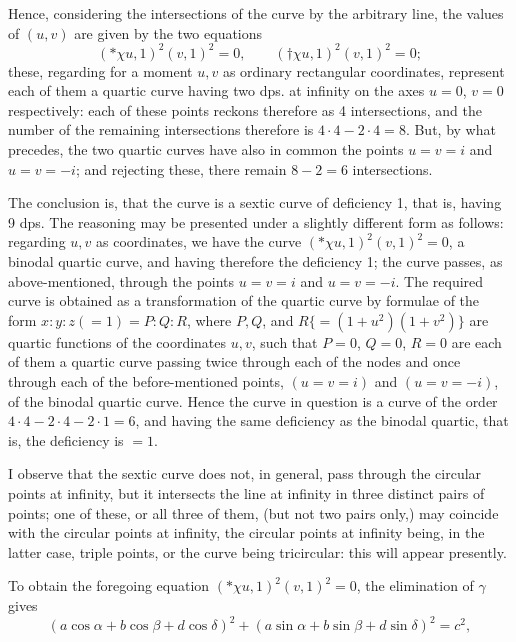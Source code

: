 \documentclass[11pt,a4paper]{article}
\begin{document}
Hence, considering the intersections of the curve by the arbitrary line, the values
of $(u,v)$ are given by the two equations
\[
({*}\chi u,1)^2(v,1)^2=0,\qquad
({\dagger}\chi u,1)^2(v,1)^2=0;
\]
these, regarding for a moment $u,v$ as ordinary rectangular coordinates, represent
each of them a quartic curve having two dps. at infinity on the axes $u=0$, $v=0$
respectively: each of these points reckons therefore as 4 intersections, and the
number of the remaining intersections therefore is $4\cdot4-2\cdot4=8$. But, by what
precedes, the two quartic curves have also in common the points $u=v=i$ and
$u=v=-i$; and rejecting these, there remain $8-2=6$ intersections.

The conclusion is, that the curve is a sextic curve of deficiency 1, that is, having
9 dps. The reasoning may be presented under a slightly different form as follows:
regarding $u,v$ as coordinates, we have the curve $({*}\chi u,1)^2(v,1)^2=0$, a
binodal quartic curve, and having therefore the deficiency 1; the curve passes, as
above-mentioned, through the points $u=v=i$ and $u=v=-i$. The required curve is
obtained as a transformation of the quartic curve by formulae of the form
$x:y:z(=1)=P:Q:R$, where $P,Q$, and $R\{=(1+u^2)(1+v^2)\}$ are quartic functions
of the coordinates $u,v$, such that $P=0$, $Q=0$, $R=0$ are each of them a quartic
curve passing twice through each of the nodes and once through each of the
before-mentioned points, $(u=v=i)$ and $(u=v=-i)$, of the binodal quartic curve.
Hence the curve in question is a curve of the order
$4\cdot4-2\cdot4-2\cdot1=6$, and having the same deficiency as the binodal quartic,
that is, the deficiency is $=1$.

I observe that the sextic curve does not, in general, pass through the circular points
at infinity, but it intersects the line at infinity in three distinct pairs of points; one
of these, or all three of them, (but not two pairs only,) may coincide with the
circular points at infinity, the circular points at infinity being, in the latter case,
triple points, or the curve being tricircular: this will appear presently.

To obtain the foregoing equation $({*}\chi u,1)^2(v,1)^2=0$, the elimination of
$\gamma$ gives
\[
(a\cos\alpha+b\cos\beta+d\cos\delta)^2
+(a\sin\alpha+b\sin\beta+d\sin\delta)^2=c^2,
\]
\end{document}
